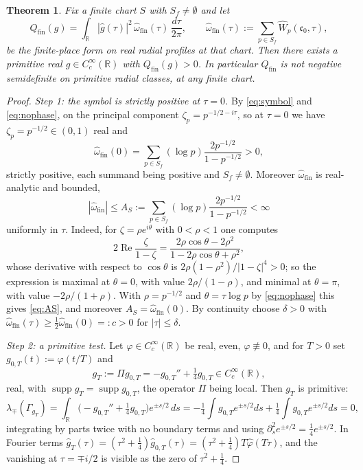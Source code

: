 \documentclass[11pt]{amsart}
\newtheorem{theorem}{Theorem}[section]
\theoremstyle{definition}
\theoremstyle{remark}
\newcommand{\R}{\mathbb R}
\newcommand{\Rel}{\operatorname{Re}}
\newcommand{\supp}{\operatorname{supp}}
\begin{document}
\begin{theorem}\label{thm:qfinpositive}
Fix a finite chart $S$ with $S_f\ne\emptyset$ and let
\begin{equation}\label{eq:qfin}
  Q_{\mathrm{fin}}(g)=\int_\R|\widehat g(\tau)|^2\,
    \widehat\omega_{\mathrm{fin}}(\tau)\,\frac{d\tau}{2\pi},\qquad
  \widehat\omega_{\mathrm{fin}}(\tau):=\sum_{p\in S_f}
    \widehat W_p(\mathfrak c_0,\tau),
\end{equation}
be the finite-place form on real radial profiles at that chart.  Then there
exists a \emph{primitive} real $g\in C_c^\infty(\R)$ with
$Q_{\mathrm{fin}}(g)>0$.  In particular $Q_{\mathrm{fin}}$ is not negative
semidefinite on primitive radial classes, at any finite chart.
\end{theorem}

\begin{proof}
\emph{Step 1: the symbol is strictly positive at $\tau=0$.} By
\eqref{eq:symbol} and \eqref{eq:nophase}, on the principal component
$\zeta_p=p^{-1/2-i\tau}$, so at $\tau=0$ we have $\zeta_p=p^{-1/2}\in(0,1)$
real and
\begin{equation}\label{eq:omegafin0}
  \widehat\omega_{\mathrm{fin}}(0)
   =\sum_{p\in S_f}(\log p)\frac{2p^{-1/2}}{1-p^{-1/2}}>0,
\end{equation}
strictly positive, each summand being positive and $S_f\ne\emptyset$. Moreover
$\widehat\omega_{\mathrm{fin}}$ is real-analytic and bounded,
\begin{equation}\label{eq:AS}
  |\widehat\omega_{\mathrm{fin}}|\le A_S
   :=\sum_{p\in S_f}(\log p)\frac{2p^{-1/2}}{1-p^{-1/2}}<\infty
\end{equation}
uniformly in $\tau$. Indeed, for $\zeta=\rho e^{i\theta}$ with $0<\rho<1$ one
computes
\[
  2\Rel\frac{\zeta}{1-\zeta}
   =\frac{2\rho\cos\theta-2\rho^2}{1-2\rho\cos\theta+\rho^2},
\]
whose derivative with respect to $\cos\theta$ is
$2\rho(1-\rho^2)/|1-\zeta|^4>0$; so the expression is maximal at $\theta=0$,
with value $2\rho/(1-\rho)$, and minimal at $\theta=\pi$, with value
$-2\rho/(1+\rho)$. With $\rho=p^{-1/2}$ and $\theta=\tau\log p$ by
\eqref{eq:nophase} this gives \eqref{eq:AS}, and moreover
$A_S=\widehat\omega_{\mathrm{fin}}(0)$. By continuity choose $\delta>0$ with
$\widehat\omega_{\mathrm{fin}}(\tau)\ge\tfrac12\widehat\omega_{\mathrm{fin}}(0)
=:c>0$ for $|\tau|\le\delta$.

\emph{Step 2: a primitive test.} Let $\varphi\in C_c^\infty(\R)$ be real, even,
$\varphi\not\equiv0$, and for $T>0$ set $g_{0,T}(t):=\varphi(t/T)$ and
\[
  g_T:=\Pi g_{0,T}=-g_{0,T}''+\tfrac14g_{0,T}\in C_c^\infty(\R),
\]
real, with $\supp g_T=\supp g_{0,T}$, the operator $\Pi$ being local. Then
$g_T$ is primitive:
\[
  \lambda_\mp(\Gamma_{g_T})
   =\int_\R\bigl(-g_{0,T}''+\tfrac14g_{0,T}\bigr)e^{\pm s/2}\,ds
   =-\tfrac14\int g_{0,T}e^{\pm s/2}ds+\tfrac14\int g_{0,T}e^{\pm s/2}ds=0,
\]
integrating by parts twice with no boundary terms and using
$\partial_s^2e^{\pm s/2}=\tfrac14e^{\pm s/2}$. In Fourier terms
$\widehat g_T(\tau)=(\tau^2+\tfrac14)\widehat g_{0,T}(\tau)
=(\tau^2+\tfrac14)T\widehat\varphi(T\tau)$, and the vanishing at
$\tau=\mp i/2$ is visible as the zero of $\tau^2+\tfrac14$.


\end{proof}
\end{document}
